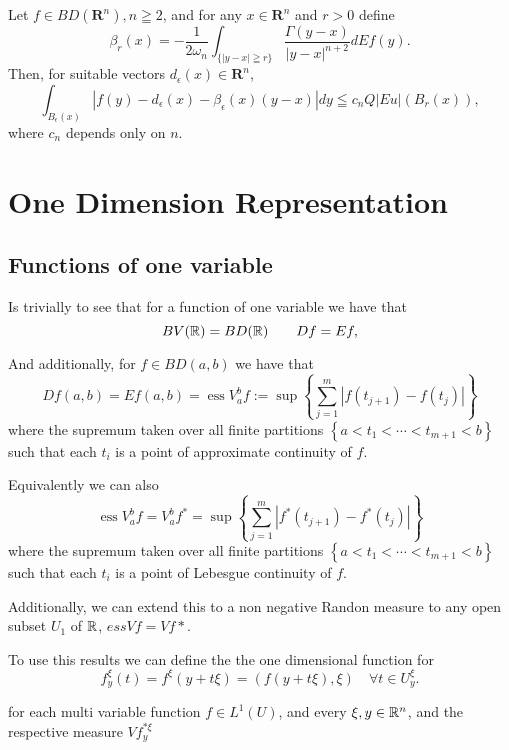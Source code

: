 \begin{theorem}
Let $f \in B D\left(\mathbf{R}^n\right), n \geqq 2$, and for any $x \in \mathbf{R}^n$ and $r>0$ define
$$
\beta_{r}(x)=-\frac{1}{2 \omega_n} \int_{\{|y-x| \geqq r\}} \frac{\Gamma(y-x)}{|y-x|^{n+2}} d E f(y) .
$$
Then, for suitable vectors $d_\epsilon(x) \in \mathbf{R}^n$,
$$
\int_{B_\epsilon(x)}\left|f(y)-d_\epsilon(x)-\beta_\epsilon(x)(y-x)\right| d y \leqq c_n Q|E u|\left(B_{r}(x)\right),
$$
where $c_n$ depends only on $n$.
\end{theorem}
\section{One Dimension Representation}
\subsection{Functions of one variable}

Is trivially to see that for  a function of one variable we have that $$BV(\mathbb{R})=BD(\mathbb{R})\qquad Df=Ef,$$

And additionally, for $f\in BD(a,b)$ we have that
$$Df(a,b)=Ef(a,b)=\operatorname{ess} V_a^b f:=\sup \left\{\sum_{j=1}^m\left|f\left(t_{j+1}\right)-f\left(t_j\right)\right|\right\}
$$
where the supremum taken over all finite partitions $\left\{a<t_1<\cdots<t_{m+1}<b\right\}$ such that each $t_i$ is a point of approximate continuity of $f$.

Equivalently we can also $$\operatorname{ess} V_a^b f = V_a^b f^*=\sup \left\{\sum_{j=1}^m\left|f^*\left(t_{j+1}\right)-f^*\left(t_j\right)\right|\right\}$$
where the supremum taken over all finite partitions $\left\{a<t_1<\cdots<t_{m+1}<b\right\}$ such that each $t_i$ is a point of Lebesgue continuity of $f$.

Additionally, we can extend this to a non negative Randon measure to any open subset $U_1$ of $\mathbb{R}$, $ess Vf=Vf*$.

To use this results we can define the the one dimensional function for
$$f_y^{\xi}(t)=f^{\xi}(y+t \xi)=(f(y+t \xi), \xi) \quad \forall t \in U_y^{\xi} .$$

for  each multi variable function $f\in L^1(U)$, and  every $\xi,y\in\mathbb{R}^n$, and the respective measure $V f_y^{*\xi}$


 
